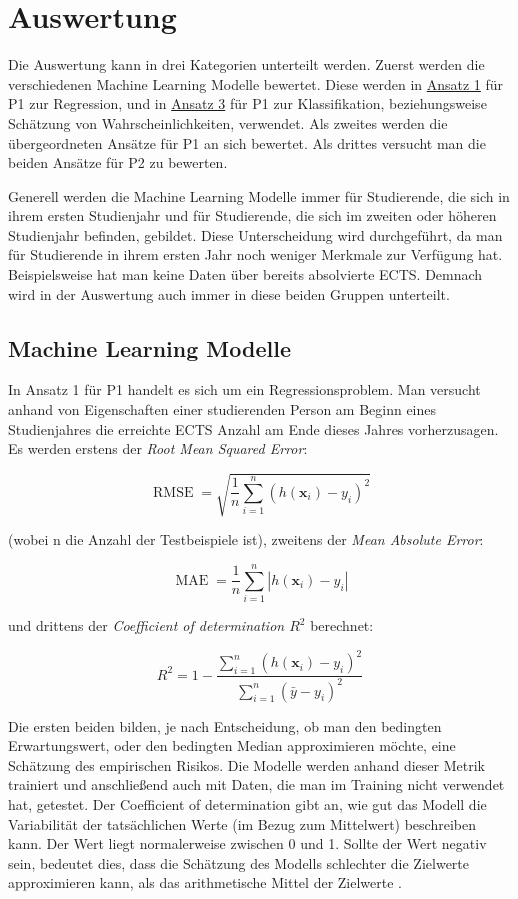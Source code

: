 

\section{Auswertung}
\label{sec:auswertung}
Die Auswertung kann in drei Kategorien unterteilt werden. Zuerst werden die verschiedenen Machine Learning Modelle bewertet.
Diese werden in \hyperref[sec:appr1]{Ansatz 1} f\"ur P1 zur Regression, und in \hyperref[sec:appr2]{Ansatz 3} f\"ur P1 zur Klassifikation,
beziehungsweise Sch\"atzung von Wahrscheinlichkeiten, verwendet.
Als zweites werden die \"ubergeordneten Ans\"atze f\"ur P1 an sich bewertet.
Als drittes versucht man die beiden Ans\"atze f\"ur P2 zu bewerten.

Generell werden die Machine Learning Modelle immer f\"ur Studierende, die sich in ihrem ersten Studienjahr und f\"ur Studierende, die sich im
zweiten oder h\"oheren Studienjahr befinden, gebildet. Diese Unterscheidung wird durchgef\"uhrt, da man f\"ur Studierende in ihrem ersten Jahr noch
weniger Merkmale zur Verf\"ugung hat. Beispielsweise hat man keine Daten \"uber bereits absolvierte ECTS. Demnach wird in der Auswertung
auch immer in diese beiden Gruppen unterteilt.


\subsection{Machine Learning Modelle}
In Ansatz 1 f\"ur P1 handelt es sich um ein Regressionsproblem. Man versucht anhand von Eigenschaften einer studierenden Person am Beginn eines Studienjahres
die erreichte ECTS Anzahl am Ende dieses Jahres vorherzusagen. Es werden erstens der
\textit{Root Mean Squared Error}:

$$ \operatorname{RMSE} = \sqrt{\frac{1}{n}\sum_{i = 1}^{n}(h(\mathbf{x}_i)-y_i)^2} $$

(wobei n die Anzahl der Testbeispiele ist), zweitens der \textit{Mean Absolute Error}:

$$ \operatorname{MAE} = \frac{1}{n}\sum_{i = 1}^{n}|h(\mathbf{x}_i) - y_i| $$

und drittens der \textit{Coefficient of determination $R^2$} berechnet:

$$ R^2 = 1 - \frac{\sum_{i = 1}^{n}(h(\mathbf{x}_i) - y_i)^2}{\sum_{i=1}^n(\bar{y}-y_i)^2} $$

Die ersten beiden bilden, je nach Entscheidung, ob man den bedingten Erwartungswert, oder den bedingten Median
approximieren m\"ochte, eine Sch\"atzung des empirischen Risikos. Die Modelle werden anhand dieser Metrik trainiert und anschlie{\ss}end
auch mit Daten, die man im Training nicht verwendet hat, getestet. Der Coefficient of determination gibt an, wie gut das Modell
die Variabilit\"at der tats\"achlichen Werte (im Bezug zum Mittelwert) beschreiben kann. Der Wert liegt normalerweise zwischen 0 und 1. Sollte der Wert negativ sein,
bedeutet dies, dass die Sch\"atzung des Modells schlechter die Zielwerte approximieren kann, als das arithmetische Mittel der Zielwerte \cite{guttag}.


